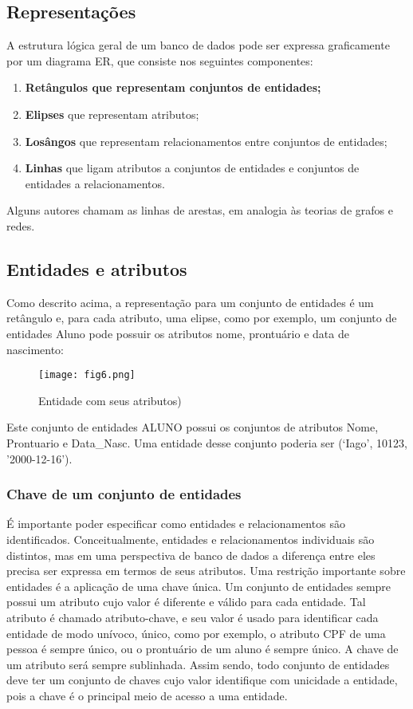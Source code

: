 \documentclass{article}
\begin{document}
\subsection*{Representações}
A estrutura lógica geral de um banco de dados pode ser expressa graficamente por um diagrama ER, que consiste nos seguintes componentes: 

\begin{enumerate}
    \item \textbf{Retângulos que representam conjuntos de entidades;}
    \item \textbf{Elipses} que representam atributos;
    \item \textbf{Losângos} que representam relacionamentos entre conjuntos de entidades;
    \item \textbf{Linhas} que ligam atributos a conjuntos de entidades e conjuntos de entidades a relacionamentos.
\end{enumerate}
Alguns autores chamam as linhas de arestas, em analogia às teorias de grafos e redes.

\subsection*{Entidades e atributos}
Como descrito acima, a representação para um conjunto de entidades é um retângulo e, para cada atributo, uma elipse, como por exemplo, um conjunto de entidades Aluno pode possuir os atributos nome, prontuário e data de nascimento:

\begin{figure}[h]
    \centering
    \texttt{[image: fig6.png]}
    \caption{Entidade com seus atributos)}
    \label{fig:fig6}
\end{figure}
Este conjunto de entidades ALUNO possui os conjuntos de atributos Nome, Prontuario e Data\_Nasc. Uma entidade desse conjunto poderia ser (‘Iago’, 10123, ’2000-12-16’).

\subsubsection*{Chave de um conjunto de entidades}
É importante poder especificar como entidades e relacionamentos são identificados. Conceitualmente, entidades e relacionamentos individuais são distintos, mas em uma perspectiva de banco de dados a diferença entre eles precisa ser expressa em termos de seus atributos. Uma restrição importante sobre entidades é a aplicação de uma chave única. Um conjunto de entidades sempre possui um atributo cujo valor é diferente e válido para cada entidade. Tal atributo é chamado atributo-chave, e seu valor é usado para identificar cada entidade de modo unívoco, único, como por exemplo, o atributo CPF de uma pessoa é sempre único, ou o prontuário de um aluno é sempre único. A chave de um atributo será sempre sublinhada. Assim sendo, todo conjunto de entidades deve ter um conjunto de chaves cujo valor identifique com unicidade a entidade, pois a chave é o principal meio de acesso a uma entidade.
\end{document}
